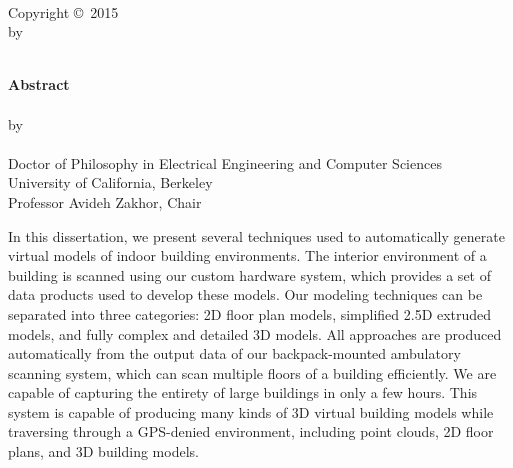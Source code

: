 \documentclass[12pt,onecolumn,oneside]{book}
\begin{document}
\newpage
{\centering
	{\textbf{\mytitle}}\\
	\hfill \break
	\hfill \break
	\hfill \break
	\hfill \break
	\hfill \break
	Copyright \copyright \, 2015\\
	by\\
	\myauthor\\
}


\newpage
{}
\setcounter{page}{1}

{\centering
	{\textbf{Abstract}}\\
	\hfill \break
	\mytitle\\
	\hfill \break
	by\\
	\hfill \break
	\myauthor\\
	\hfill \break
	Doctor of Philosophy in Electrical Engineering and Computer Sciences\\
	\hfill \break
	University of California, Berkeley\\
	\hfill \break
	Professor Avideh Zakhor, Chair\\
	\hfill \break
}

In this dissertation, we present several techniques used to automatically generate virtual models of indoor building environments.  The interior environment of a building is scanned using our custom hardware system, which provides a set of data products used to develop these models.  Our modeling techniques can be separated into three categories:  2D floor plan models, simplified 2.5D extruded models, and fully complex and detailed 3D models.  All approaches are produced automatically from the output data of our backpack-mounted ambulatory scanning system, which can scan multiple floors of a building efficiently.  We are capable of capturing the entirety of large buildings in only a few hours.  This system is capable of producing many kinds of 3D virtual building models while traversing through a GPS-denied environment, including point clouds, 2D floor plans, and 3D building models.
\end{document}
